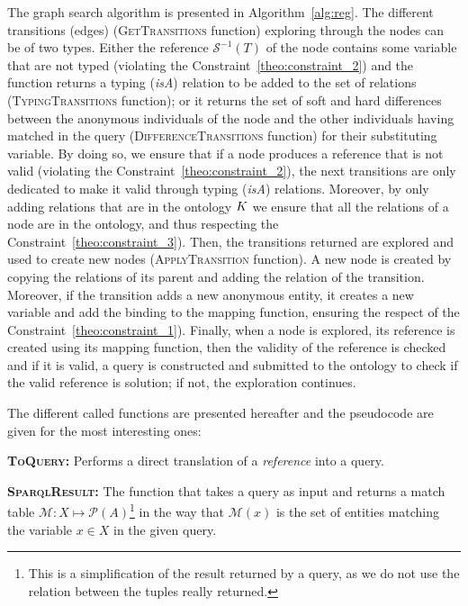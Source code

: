 \documentclass[a4paper,11pt,twoside]{StyleThese}
\begin{document}
The graph search algorithm is presented in Algorithm~\ref{alg:reg}. The different transitions (edges) (\textsc{GetTransitions} function) exploring through the nodes can be of two types. Either the reference $\mathcal{S}^{-1}(T)$ of the node contains some variable that are not typed (violating the Constraint~\ref{theo:constraint_2}) and the function returns a typing (\textit{isA}) relation to be added to the set of relations (\textsc{TypingTransitions} function); or it returns the set of soft and hard differences between the anonymous individuals of the node and the other individuals having matched in the \sparql{} query (\textsc{DifferenceTransitions} function) for their substituting variable. By doing so, we ensure that if a node produces a reference that is not valid (violating the Constraint~\ref{theo:constraint_2}), the next transitions are only dedicated to make it valid through typing (\textit{isA}) relations. Moreover, by only adding relations that are in the ontology $K$ we ensure that all the relations of a node are in the ontology, and thus respecting the Constraint~\ref{theo:constraint_3}). Then, the transitions returned are explored and used to create new nodes (\textsc{ApplyTransition} function). A new node is created by copying the relations of its parent and adding the relation of the transition. Moreover, if the transition adds a new anonymous entity, it creates a new variable and add the binding to the mapping function, ensuring the respect of the Constraint~\ref{theo:constraint_1}). Finally, when a node is explored, its reference is created using its mapping function, then the validity of the reference is checked and if it is valid, a \sparql{} query is constructed and submitted to the ontology to check if the valid reference is solution; if not, the exploration continues.

The different called functions are presented hereafter and the pseudocode are given for the most interesting ones:

\textbf{\textsc{ToQuery}:}
Performs a direct translation of a \textit{reference} into a \sparql{} query.

\textbf{\textsc{SparqlResult}:}
The function that takes a \sparql{} query as input and returns a match table $\mathcal{M}: X \mapsto \mathcal{P}(A)$\footnote{This is a simplification of the result returned by a \sparql{} query, as we do not use the relation between the tuples really returned.} in the way that $\mathcal{M}(x)$ is the set of entities matching the variable $x \in X$ in the given query.
\end{document}
